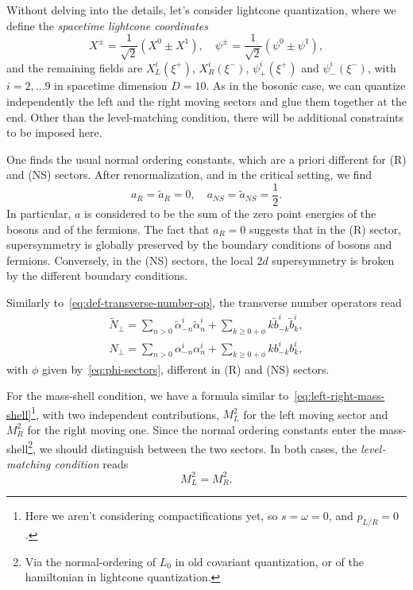 Without delving into the details, let's consider lightcone quantization, where we define the \emph{spacetime lightcone coordinates}
\begin{equation}
    X^\pm = \frac{1}{\sqrt{2}} (X^0 \pm X^1), \quad \psi^\pm = \frac{1}{\sqrt{2}} (\psi^0 \pm \psi^1),
\end{equation}
and the remaining fields are $X^i_L(\xi^+)$, $X^i_R(\xi^-)$, $\psi^i_+(\xi^+)$ and $\psi^i_-(\xi^-)$, with $i = 2, \dots 9$ in spacetime dimension $D = 10$. As in the bosonic case, we can quantize independently the left and the right moving sectors and glue them together at the end. Other than the level-matching condition, there will be additional constraints to be imposed here.

One finds the usual normal ordering constants, which are a priori different for (R) and (NS) sectors. After renormalization, and in the critical setting, we find
\begin{equation}
    a_R = \tilde{a}_R = 0, \quad a_{NS} = \tilde{a}_{NS} = \frac{1}{2} .
\end{equation}
In particular, $a$ is considered to be the sum of the zero point energies of the bosons and of the fermions. The fact that $a_R = 0$ suggests that in the (R) sector, supersymmetry is globally preserved by the boundary conditions of bosons and fermions. Conversely, in the (NS) sectors, the local $2d$ supersymmetry is broken by the different boundary conditions.

Similarly to~\eqref{eq:def-transverse-number-op}, the transverse number operators read
\begin{equation}\label{eq:superstring-transverse-number-op}
\begin{aligned}
    \tilde{N}_\perp = \sum_{n > 0} \tilde{\alpha}_{-n}^i \tilde{\alpha}^i_n + \sum_{k \geq 0 + \phi} k \tilde{b}^i_{-k} \tilde{b}^i_k ,\\
    N_\perp = \sum_{n > 0} \alpha_{-n}^i \alpha^i_n + \sum_{k \geq 0 + \phi} k b^i_{-k} b^i_k ,
\end{aligned}
\end{equation}
with $\phi$ given by~\eqref{eq:phi-sectors}, different in (R) and (NS) sectors.


For the mass-shell condition, we have a formula similar to~\eqref{eq:left-right-mass-shell}\footnote{Here we aren't considering compactifications yet, so $s = \omega = 0$, and $p_{L/R} = 0$.}, with two independent contributions, $M^2_L$ for the left moving sector and $M^2_R$ for the right moving one. Since the normal ordering constants enter the mass-shell\footnote{Via the normal-ordering of $L_0$ in old covariant quantization, or of the hamiltonian in lightcone quantization.}, we should distinguish between the two sectors. In both cases, the \emph{level-matching condition} reads
\begin{equation}\label{eq:superstring-level-matching}
    M^2_L = M^2_R.
\end{equation}

